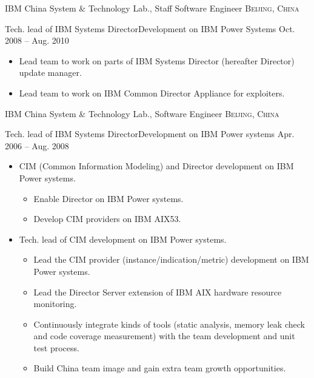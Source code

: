 \documentclass[10pt,letterpaper]{article}
\begin{document}
\headedsection 
{IBM China System \& Technology Lab., Staff Software Engineer}
{\textsc{Beijing, China}} {

\headedsubsection %
{Tech. lead of IBM Systems Director\texttrademark Development on IBM Power
Systems}
{Oct. 2008 -- Aug. 2010}
{
    \begin{itemize}
        \item Lead team to work on parts of IBM Systems Director\texttrademark
            (hereafter Director) update manager.
        \item Lead team to work on IBM Common Director Appliance for
            exploiters.
    \end{itemize}
}
}

\headedsection 
{IBM China System \& Technology Lab., Software Engineer}
{\textsc{Beijing, China}} {

\headedsubsection %
{Tech. lead of IBM Systems Director\texttrademark Development on IBM Power
systems}
{Apr. 2006 -- Aug. 2008}
{
    \begin{itemize}
        \item CIM (Common Information Modeling) and Director development on IBM Power systems.
        \begin{itemize}
            \item Enable Director on IBM Power systems.
            \item Develop CIM providers on IBM AIX53.
        \end{itemize}
        \item Tech. lead of CIM development on IBM Power systems.
        \begin{itemize}
            \item Lead the CIM provider (instance/indication/metric)
                development on IBM Power systems.
            \item Lead the Director Server extension of IBM AIX hardware
                resource monitoring.
            \item Continuously integrate kinds of tools (static analysis,
                memory leak check and code coverage measurement) with the team
                development and unit test process.
            \item Build China team image and gain extra team growth
                opportunities.
        \end{itemize}
    \end{itemize}

}
}
\end{document}
